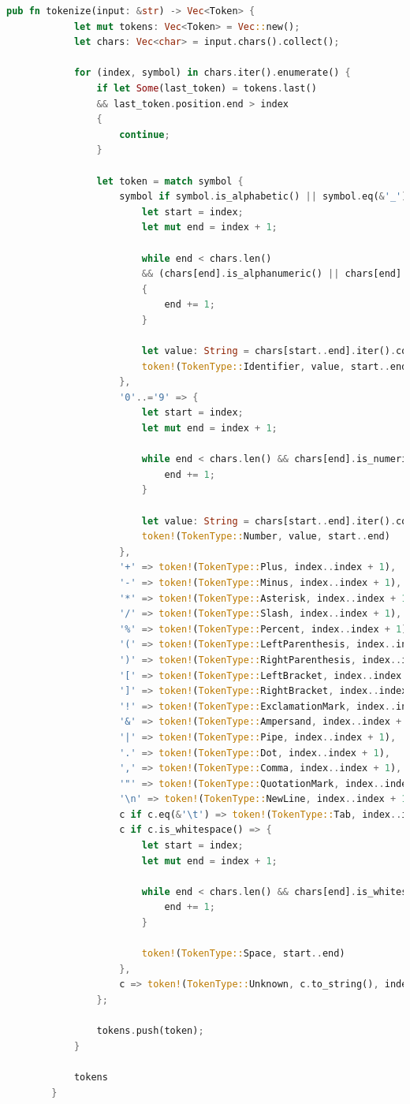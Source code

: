 \documentclass[14pt, a4paper]{extreport}
\begin{document}
\begin{lstlisting}[language=Rust]
		pub fn tokenize(input: &str) -> Vec<Token> {
			let mut tokens: Vec<Token> = Vec::new();
			let chars: Vec<char> = input.chars().collect();
			
			for (index, symbol) in chars.iter().enumerate() {
				if let Some(last_token) = tokens.last()
				&& last_token.position.end > index
				{
					continue;
				}
				
				let token = match symbol {
					symbol if symbol.is_alphabetic() || symbol.eq(&'_') => {
						let start = index;
						let mut end = index + 1;
						
						while end < chars.len()
						&& (chars[end].is_alphanumeric() || chars[end] == '_')
						{
							end += 1;
						}
						
						let value: String = chars[start..end].iter().collect();
						token!(TokenType::Identifier, value, start..end)
					},
					'0'..='9' => {
						let start = index;
						let mut end = index + 1;
						
						while end < chars.len() && chars[end].is_numeric() {
							end += 1;
						}
						
						let value: String = chars[start..end].iter().collect();
						token!(TokenType::Number, value, start..end)
					},
					'+' => token!(TokenType::Plus, index..index + 1),
					'-' => token!(TokenType::Minus, index..index + 1),
					'*' => token!(TokenType::Asterisk, index..index + 1),
					'/' => token!(TokenType::Slash, index..index + 1),
					'%' => token!(TokenType::Percent, index..index + 1),
					'(' => token!(TokenType::LeftParenthesis, index..index + 1),
					')' => token!(TokenType::RightParenthesis, index..index + 1),
					'[' => token!(TokenType::LeftBracket, index..index + 1),
					']' => token!(TokenType::RightBracket, index..index + 1),
					'!' => token!(TokenType::ExclamationMark, index..index + 1),
					'&' => token!(TokenType::Ampersand, index..index + 1),
					'|' => token!(TokenType::Pipe, index..index + 1),
					'.' => token!(TokenType::Dot, index..index + 1),
					',' => token!(TokenType::Comma, index..index + 1),
					'"' => token!(TokenType::QuotationMark, index..index + 1),
					'\n' => token!(TokenType::NewLine, index..index + 1),
					c if c.eq(&'\t') => token!(TokenType::Tab, index..index + 1),
					c if c.is_whitespace() => {
						let start = index;
						let mut end = index + 1;
						
						while end < chars.len() && chars[end].is_whitespace() {
							end += 1;
						}
						
						token!(TokenType::Space, start..end)
					},
					c => token!(TokenType::Unknown, c.to_string(), index..index + 1),
				};
				
				tokens.push(token);
			}
			
			tokens
		}
	\end{lstlisting}
	
\end{document}
